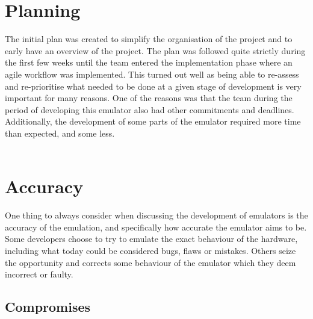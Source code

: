 \section{Planning}%
The initial plan was created to simplify the organisation of the project and to early have an overview of the project. The plan was followed quite strictly during the first few weeks until the team entered the implementation phase where an agile workflow was implemented. This turned out well as being able to re-assess and re-prioritise what needed to be done at a given stage of development is very important for many reasons. One of the reasons was that the team during the period of developing this emulator also had other commitments and deadlines. Additionally, the development of some parts of the emulator required more time than expected, and some less. %
\\\\
\section{Accuracy}
One thing to always consider when discussing the development of emulators is the accuracy of the emulation, and specifically how accurate the emulator aims to be. Some developers choose to try to emulate the exact behaviour of the hardware, including what today could be considered bugs, flaws or mistakes. Others seize the opportunity and corrects some behaviour of the emulator which they deem incorrect or faulty.

\subsection{Compromises}

